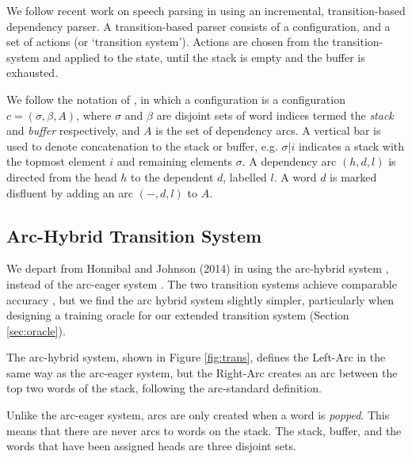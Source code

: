 \documentclass[11pt,letterpaper]{article}
\begin{document}
We follow recent work on speech parsing in using an incremental, transition-based
dependency parser.
A transition-based parser \citep{nivre:08} consists of a configuration,
and a set of actions (or `transition system').  Actions are chosen from the
transition-system and applied to the state, until the stack is empty and the
buffer is exhausted.

We follow the notation of \citet{goldberg:13}, in which a configuration
is a configuration $c = (\sigma, \beta, A)$,
where $\sigma$ and $\beta$ are disjoint sets of word
indices termed the \emph{stack} and \emph{buffer} respectively, and $A$ is the
set of dependency arcs.
A vertical bar is used to denote concatenation
to the stack or buffer, e.g. $\sigma | i$ indicates a stack with the topmost
element $i$ and remaining elements $\sigma$.
A dependency arc $(h, d, l)$ is directed from the
head $h$ to the dependent $d$, labelled $l$.
A word $d$ is marked disfluent by adding an arc $(-, d, l)$ to $A$.

\subsection{Arc-Hybrid Transition System}

We depart from Honnibal and Johnson (2014) in using the arc-hybrid system \citep{kuhlmann:11},
instead of the arc-eager system \citep{nivre:03}. The two transition systems achieve
comparable accuracy \citep{goldberg:13}, but we find the arc hybrid system slightly
simpler, particularly when designing a training oracle for our extended transition
system (Section \ref{sec:oracle}).

The arc-hybrid system, shown in Figure \ref{fig:trans}, defines the Left-Arc in
the same way as the \citet{nivre:03}
arc-eager system, but the Right-Arc creates an arc between the top two words of
the stack, following the arc-standard definition.

Unlike the arc-eager system,
arcs are only created when a word is \emph{popped}.
This means that there are never arcs to words on the stack.
The stack, buffer, and the words that have been assigned heads are three disjoint
sets.
\end{document}
